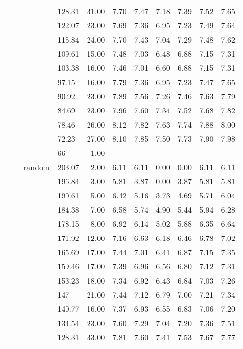 \begin{longtable}{llllrrrrrrr}
   &  &  & 128.31 & 31.00 & 7.70 & 7.47 & 7.18 & 7.39 & 7.52 & 7.65 \\ 
   &  &  & 122.07 & 23.00 & 7.69 & 7.36 & 6.95 & 7.23 & 7.49 & 7.64 \\ 
   &  &  & 115.84 & 24.00 & 7.70 & 7.43 & 7.04 & 7.29 & 7.48 & 7.62 \\ 
   &  &  & 109.61 & 15.00 & 7.48 & 7.03 & 6.48 & 6.88 & 7.15 & 7.31 \\ 
   &  &  & 103.38 & 16.00 & 7.46 & 7.01 & 6.60 & 6.88 & 7.15 & 7.31 \\ 
   &  &  & 97.15 & 16.00 & 7.79 & 7.36 & 6.95 & 7.23 & 7.47 & 7.65 \\ 
   &  &  & 90.92 & 23.00 & 7.89 & 7.56 & 7.26 & 7.46 & 7.63 & 7.79 \\ 
   &  &  & 84.69 & 23.00 & 7.96 & 7.60 & 7.34 & 7.52 & 7.68 & 7.82 \\ 
   &  &  & 78.46 & 26.00 & 8.12 & 7.82 & 7.63 & 7.74 & 7.88 & 8.00 \\ 
   &  &  & 72.23 & 27.00 & 8.10 & 7.85 & 7.50 & 7.73 & 7.90 & 7.98 \\ 
   &  &  & 66 & 1.00 &  &  &  &  &  &  \\ 
   &  & random & 203.07 & 2.00 & 6.11 & 6.11 & 0.00 & 0.00 & 6.11 & 6.11 \\ 
   &  &  & 196.84 & 3.00 & 5.81 & 3.87 & 0.00 & 3.87 & 5.81 & 5.81 \\ 
   &  &  & 190.61 & 5.00 & 6.42 & 5.16 & 3.73 & 4.69 & 5.71 & 6.04 \\ 
   &  &  & 184.38 & 7.00 & 6.58 & 5.74 & 4.90 & 5.44 & 5.94 & 6.28 \\ 
   &  &  & 178.15 & 8.00 & 6.92 & 6.14 & 5.02 & 5.88 & 6.35 & 6.64 \\ 
   &  &  & 171.92 & 12.00 & 7.16 & 6.63 & 6.18 & 6.46 & 6.78 & 7.02 \\ 
   &  &  & 165.69 & 17.00 & 7.44 & 7.01 & 6.41 & 6.87 & 7.15 & 7.35 \\ 
   &  &  & 159.46 & 17.00 & 7.39 & 6.96 & 6.56 & 6.80 & 7.12 & 7.31 \\ 
   &  &  & 153.23 & 18.00 & 7.34 & 6.92 & 6.43 & 6.84 & 7.03 & 7.26 \\ 
   &  &  & 147 & 21.00 & 7.44 & 7.12 & 6.79 & 7.00 & 7.21 & 7.34 \\ 
   &  &  & 140.77 & 16.00 & 7.37 & 6.93 & 6.55 & 6.83 & 7.06 & 7.20 \\ 
   &  &  & 134.54 & 23.00 & 7.60 & 7.29 & 7.04 & 7.20 & 7.36 & 7.51 \\ 
   &  &  & 128.31 & 33.00 & 7.81 & 7.60 & 7.41 & 7.53 & 7.67 & 7.77 \\ 

\end{longtable}
